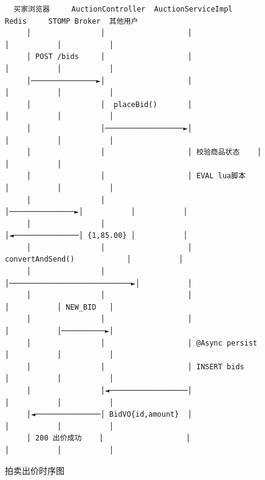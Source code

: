 \documentclass[12pt,a4paper]{ctexart}
\numberwithin{figure}{section}
\numberwithin{table}{section}
\begin{document}
\begin{figure}[H]
\centering
{\small
\begin{verbatim}
  买家浏览器     AuctionController  AuctionServiceImpl    Redis     STOMP Broker  其他用户
     │                │                   │                │           │           │
     │ POST /bids     │                   │                │           │           │
     │───────────────►│                   │                │           │           │
     │                │  placeBid()       │                │           │           │
     │                │──────────────────►│                │           │           │
     │                │                   │ 校验商品状态    │           │           │
     │                │                   │ EVAL lua脚本    │           │           │
     │                │                   │───────────────►│           │           │
     │                │                   │◄───────────────│ {1,85.00} │           │
     │                │                   │ convertAndSend()            │           │
     │                │                   │────────────────────────────►│           │
     │                │                   │                │           │ NEW_BID   │
     │                │                   │                │           │──────────►│
     │                │                   │ @Async persist  │           │           │
     │                │                   │ INSERT bids     │           │           │
     │                │◄──────────────────│                 │           │           │
     │◄───────────────│ BidVO{id,amount}  │                 │           │           │
     │ 200 出价成功    │                   │                 │           │           │
\end{verbatim}
}
\caption{拍卖出价时序图}
\label{fig:m3-bid-sequence}
\end{figure}
\end{document}

